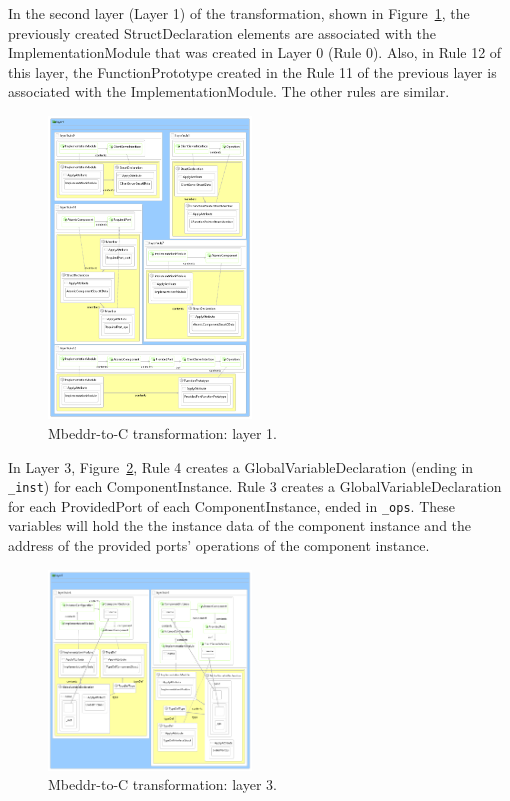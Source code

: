  In the second layer
(Layer 1) of the transformation, shown in Figure~\ref{fig:mb2c_layer_1}, the
previously created StructDeclaration elements are associated with the
ImplementationModule that was created in Layer 0 (Rule 0).
Also, in Rule 12 of this layer, the FunctionPrototype created in the Rule 11 of
the previous layer is associated with the ImplementationModule.
The other rules are similar.

\begin{figure}
\begin{center}
  \includegraphics[width=0.48\textwidth]{figures/mbeddr/mbeddr2C_optimized_layer_1}
  \caption{Mbeddr-to-C transformation: layer 1.}
  \label{fig:mb2c_layer_1}
\end{center}
\end{figure}

In Layer 3, Figure~\ref{fig:mb2c_layer_3}, Rule 4 creates a
GlobalVariableDeclaration (ending in \verb=_inst=) for each ComponentInstance.
Rule 3 creates a GlobalVariableDeclaration for each ProvidedPort of each
ComponentInstance, ended in \verb=_ops=.
These variables will hold the the instance data of the component instance and
the address of the provided ports' operations of the component instance.

\begin{figure}
\begin{center}
  \includegraphics[width=0.48\textwidth]{figures/mbeddr/mbeddr2C_optimized_layer_3}
  \caption{Mbeddr-to-C transformation: layer 3.}
  \label{fig:mb2c_layer_3}
\end{center}
\end{figure}

